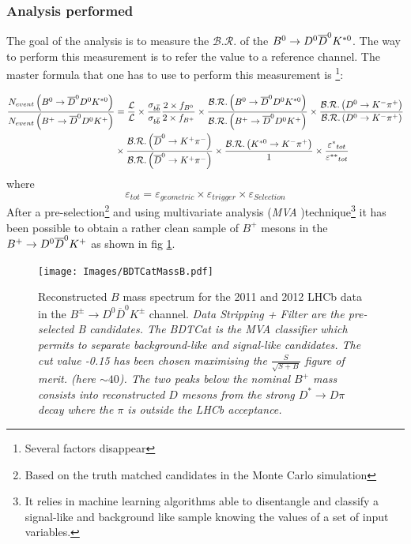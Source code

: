 \documentclass[paper=a4, fontsize=10pt]{scrartcl}
\numberwithin{equation}{section}		%
\numberwithin{figure}{section}			%
\numberwithin{table}{section}				%
\begin{document}
\subsubsection{Analysis performed}
The goal of the analysis is to measure the $\mathcal{B.R.}$ of the  $B^{0} \rightarrow D^0 \overline{D}^{0} K^{\ast 0}$. The way to perform this measurement is to refer the value to a reference channel. The master formula that one has to use to perform this measurement is \footnote{Several factors disappear}:

\tiny \begin{equation}\label{1}
\begin{split} 
\frac { { N }_{ event }\left( B^0\rightarrow \overline{D}^0 D^0 K^{\ast 0} \right)  }{ { N }_{ event }\left( B^+\rightarrow \overline{D}^0 D^0 K^{+} \right)  }&  = \frac{\mathcal{L}}{\mathcal{L}}\times \frac{\sigma_{b\overline{b}}}{\sigma_{b\overline{b}}}   \frac { 2 \times { f }_{ { B }^{ 0 } } }{ 2 \times { f }_{ { B }^{ + } } } \times \frac { \mathcal{B.R.}\left( B^0\rightarrow \overline{D}^0 D^0 K^{\ast 0} \right)  }{ \mathcal{B.R.}\left(B^+\rightarrow \overline{D}^0 D^0 K^{+} \right)  } \times \frac { \mathcal{B.R.}\left( D^{0} \rightarrow K^{-} \pi^{+} \right)  }{ \mathcal{B.R.}\left( D^{0} \rightarrow K^{-} \pi^{+} \right)  }  \\   & \times \frac { \mathcal{B.R.}\left( \overline{D}^0 \rightarrow K^+ \pi^- \right)  }{ \mathcal{B.R.}\left( \overline{D}^0 \rightarrow K^+ \pi^- \right)  } \times \frac { \mathcal{B.R.}\left( K^{\ast 0} \rightarrow K^- \pi^+ \right)  }{ 1 } \times \frac { { \varepsilon ^{\ast} }_{ tot } }{ {  \varepsilon^{\ast \ast} }_{ tot } }
\end{split} 
\end{equation}
\normalsize where
\tiny \begin{equation} \label{epsilon}
 \varepsilon_{ tot } = \varepsilon_{geometric}\times \varepsilon_{trigger}\times \varepsilon_{Selection}
\end{equation}
\normalsize After a pre-selection\footnote{Based on the truth matched candidates in the Monte Carlo simulation} and using multivariate analysis (\textit{MVA} )technique\footnote{It relies in machine learning algorithms able to disentangle and classify a signal-like and background like sample knowing the values of a set of input variables.} it has been possible to obtain a rather clean sample of $B^{+}$ mesons in the $B^{+} \rightarrow D^0 \overline{D}^{0} K^{+}$ as shown in fig \ref{Bmass}.
\begin{figure}[h!]
\begin{center}
\texttt{[image: Images/BDTCatMassB.pdf]}
\caption{Reconstructed $B$ mass spectrum for  the 2011 and 2012 LHCb data in the $B^{\pm} \rightarrow D^{0} \overline{D}^{0} K^{\pm}$ channel. \it{Data Stripping + Filter} are the pre-selected \textit{B} candidates. The \it{BDTCat} is the \it{MVA} classifier which permits to separate background-like and signal-like candidates. The cut value \it{-0.15} has been chosen maximising the $\frac{S}{\sqrt{S+B}}$ figure of merit. (here $\sim 40$). The two peaks below the nominal $B^{+}$ mass  consists into reconstructed $D$ mesons from the strong $D^{\ast}\rightarrow D \pi$ decay where the $\pi$ is outside the LHCb acceptance.}\label{Bmass}
\end{center}
\end{figure}
\end{document}
